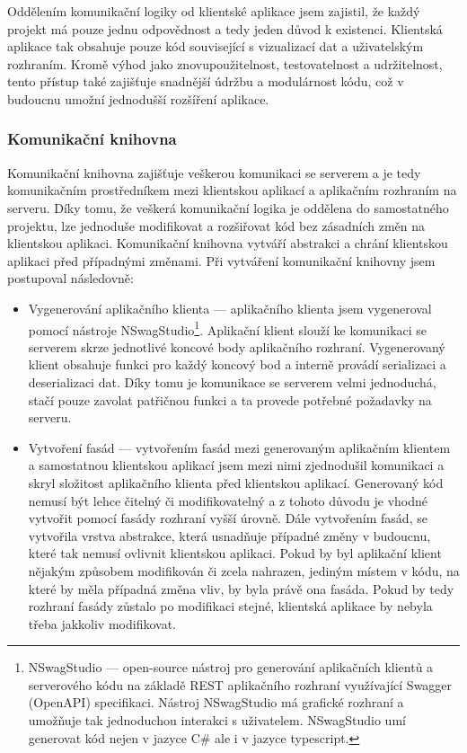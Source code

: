       Oddělením komunikační logiky od klientské aplikace jsem zajistil, že každý projekt má pouze jednu odpovědnost a tedy jeden důvod k existenci. Klientská aplikace tak obsahuje pouze kód související s vizualizací dat a uživatelským rozhraním. Kromě výhod jako znovupoužitelnost, testovatelnost a udržitelnost, tento přístup také zajišťuje snadnější údržbu a modulárnost kódu, což v budoucnu umožní jednodušší rozšíření aplikace.

    \subsubsection*{Komunikační knihovna}
        Komunikační knihovna zajišťuje veškerou komunikaci se serverem a je tedy komunikačním prostředníkem mezi klientskou aplikací a aplikačním rozhraním na serveru. Díky tomu, že veškerá komunikační logika je oddělena do samostatného projektu, lze jednoduše modifikovat a rozšiřovat kód bez zásadních změn na klientskou aplikaci. Komunikační knihovna vytváří abstrakci a chrání klientskou aplikaci před případnými změnami. Při vytváření komunikační knihovny jsem postupoval následovně:

        \begin{itemize}
            \item Vygenerování aplikačního klienta --- aplikačního klienta jsem vygeneroval pomocí nástroje NSwagStudio\footnote{NSwagStudio --- open-source nástroj pro generování aplikačních klientů a serverového kódu na základě REST aplikačního rozhraní využívající Swagger (OpenAPI) specifikaci. Nástroj NSwagStudio má grafické rozhraní a umožňuje tak jednoduchou interakci s uživatelem. NSwagStudio umí generovat kód nejen v jazyce C\# ale i v jazyce typescript.}. Aplikační klient slouží ke komunikaci se serverem skrze jednotlivé koncové body aplikačního rozhraní. Vygenerovaný klient obsahuje funkci pro každý koncový bod a interně provádí serializaci a deserializaci dat. Díky tomu je komunikace se serverem velmi jednoduchá, stačí pouze zavolat patřičnou funkci a ta provede potřebné požadavky na serveru.
            \item Vytvoření fasád --- vytvořením fasád mezi generovaným aplikačním klientem a samostatnou klientskou aplikací jsem mezi nimi zjednodušil komunikaci a skryl složitost aplikačního klienta před klientskou aplikací. Generovaný kód nemusí být lehce čitelný či modifikovatelný a z tohoto důvodu je vhodné vytvořit pomocí fasády rozhraní vyšší úrovně. Dále vytvořením fasád, se vytvořila vrstva abstrakce, která usnadňuje případné změny v budoucnu, které tak nemusí ovlivnit klientskou aplikaci. Pokud by byl aplikační klient nějakým způsobem modifikován či zcela nahrazen, jediným místem v kódu, na které by měla případná změna vliv, by byla právě ona fasáda. Pokud by tedy rozhraní fasády zůstalo po modifikaci stejné, klientská aplikace by nebyla třeba jakkoliv modifikovat.
        \end{itemize}
        
